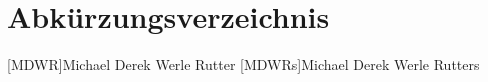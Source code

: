 %
%

\chapter*{Abkürzungsverzeichnis}
\begin{acronym}
%
%
    [MDWR]{Michael Derek Werle Rutter}
    [MDWRs]{Michael Derek Werle Rutters}
%
%
\end{acronym}

